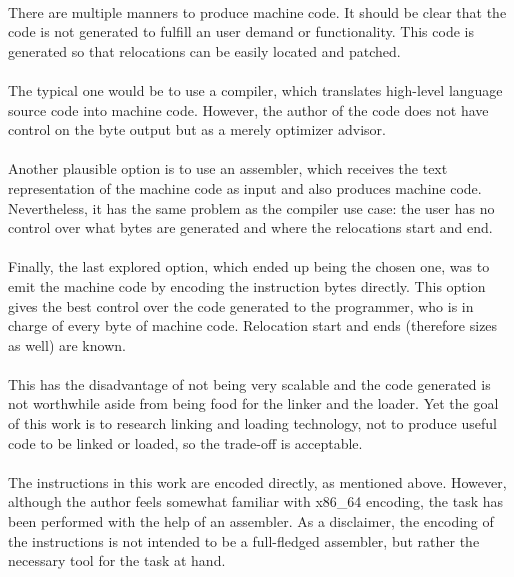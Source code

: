 \documentclass[12pt]{article}
\begin{document}
	\paragraph{}There are multiple manners to produce machine code. It should be clear that the code is not generated to fulfill an user demand or functionality. This code is generated so that relocations can be easily located and patched.
	\paragraph{}The typical one would be to use a compiler, which translates high-level language source code into machine code. However, the author of the code does not have control on the byte output but as a merely optimizer advisor.
	\paragraph{}Another plausible option is to use an assembler, which receives the text representation of the machine code as input and also produces machine code. Nevertheless, it has the same problem as the compiler use case: the user has no control over what bytes are generated and where the relocations start and end.
	\paragraph{}Finally, the last explored option, which ended up being the chosen one, was to emit the machine code by encoding the instruction bytes directly. This option gives the best control over the code generated to the programmer, who is in charge of every byte of machine code. Relocation start and ends (therefore sizes as well) are known.
	\paragraph{}This has the disadvantage of not being very scalable and the code generated is not worthwhile aside from being food for the linker and the loader. Yet the goal of this work is to research linking and loading technology, not to produce useful code to be linked or loaded, so the trade-off is acceptable.
	\paragraph{}The instructions in this work are encoded directly, as mentioned above. However, although the author feels somewhat familiar with x86\_64 encoding, the task has been performed with the help of an assembler. As a disclaimer, the encoding of the instructions is not intended to be a full-fledged assembler, but rather the necessary tool for the task at hand.
\end{document}
